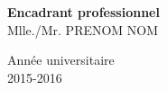 \begin{center}
 \vspace{1cm}
 \begin{minipage}{6cm}
\begin{center}
\textbf{Encadrant professionnel} \\ Mlle./Mr. PRENOM NOM
\end{center}
 \end{minipage}
 
 \vspace{2cm}
 
 \begin{center}
\footnotesize{Ann\'ee universitaire} \\ \footnotesize{2015-2016}
\end{center}
 






\end{center}
